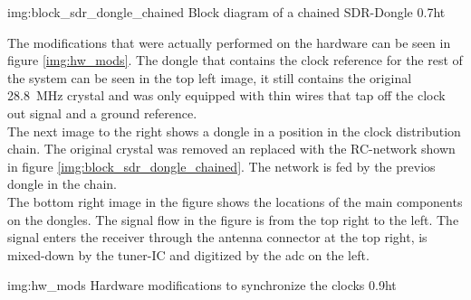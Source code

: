              {img:block_sdr_dongle_chained}
             {Block diagram of a chained SDR-Dongle}
             {0.7}{ht}

The modifications that were actually performed on the
hardware can be seen in figure \ref{img:hw_mods}.
The dongle that contains the clock reference for
the rest of the system can be seen in the top left
image, it still contains the original
\SI{28.8}{\mega\hertz} crystal and was only equipped
with thin wires that tap off the clock out signal
and a ground reference. \\

The next image to the right shows a dongle
in a position in the clock distribution chain.
The original crystal was removed an replaced with
the RC-network shown in figure \ref{img:block_sdr_dongle_chained}.
The network is fed by the previos dongle in the chain. \\

The bottom right image in the figure shows the
locations of the main components on the dongles.
The signal flow in the figure is from the top right
to the left.
The signal enters the receiver through the antenna
connector at the top right, is mixed-down by the
tuner-IC and digitized by the \acrshort{adc} on the left.

             {img:hw_mods}
             {Hardware modifications to synchronize the clocks}
             {0.9}{ht}
